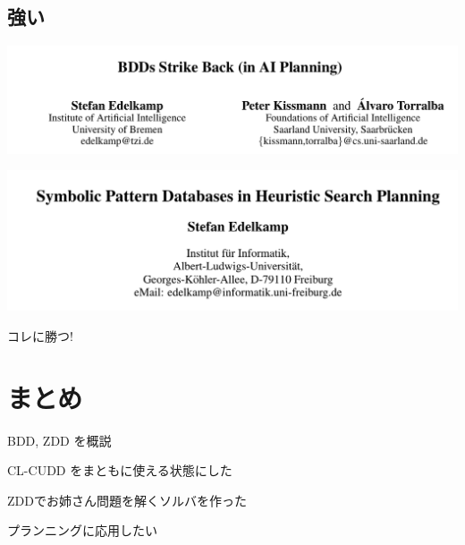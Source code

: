 \subsection{強い}
\label{sec-9-3}

\includegraphics{img/static/bdd-paper1.png}

\includegraphics{img/static/bdd-paper2.png}


\begin{alignright}
コレに勝つ!
\end{alignright}

\section{まとめ}
\label{sec-10}

BDD, ZDD を概説

CL-CUDD をまともに使える状態にした

ZDDでお姉さん問題を解くソルバを作った

プランニングに応用したい

